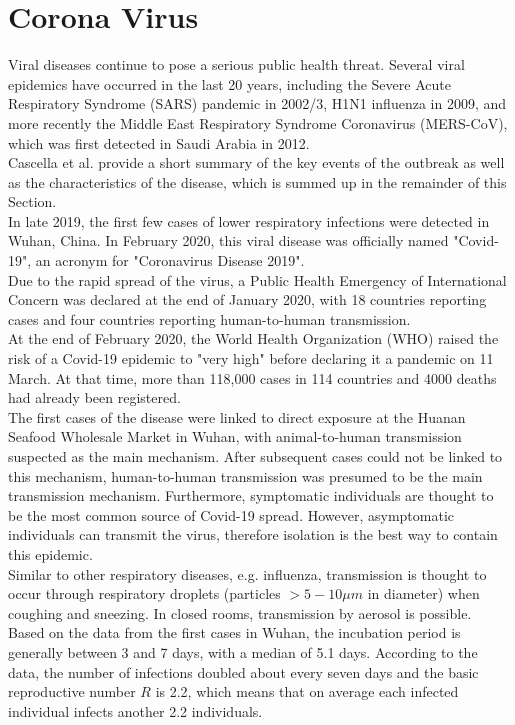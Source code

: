 \section{Corona Virus}
\label{sec:corona}
Viral diseases continue to pose a serious public health threat. Several viral epidemics have occurred in the last 20 years, including the Severe Acute Respiratory Syndrome (SARS) pandemic in 2002/3, H1N1 influenza in 2009, and more recently the Middle East Respiratory Syndrome Coronavirus (MERS-CoV), which was first detected in Saudi Arabia in 2012. \\
Cascella et al. provide a short summary of the key events of the outbreak as well as the characteristics of the disease, which is summed up in the remainder of this Section. \\
In late 2019, the first few cases of lower respiratory infections were detected in Wuhan, China. In February 2020, this viral disease was officially named "Covid-19", an acronym for "Coronavirus Disease 2019". \\
Due to the rapid spread of the virus, a Public Health Emergency of International Concern was declared at the end of January 2020, with 18 countries reporting cases and four countries reporting human-to-human transmission. \\
At the end of February 2020, the World Health Organization (WHO) raised the risk of a Covid-19 epidemic to "very high" before declaring it a pandemic on 11 March. At that time, more than 118,000 cases in 114 countries and 4000 deaths had already been registered. \\
The first cases of the disease were linked to direct exposure at the Huanan Seafood Wholesale Market in Wuhan, with animal-to-human transmission suspected as the main mechanism. After subsequent cases could not be linked to this mechanism, human-to-human transmission was presumed to be the main transmission mechanism. Furthermore, symptomatic individuals are thought to be the most common source of Covid-19 spread. However, asymptomatic individuals can transmit the virus, therefore isolation is the best way to contain this epidemic. \\
Similar to other respiratory diseases, e.g. influenza, transmission is thought to occur through respiratory droplets (particles $>5-10\mu m$ in diameter) when coughing and sneezing. In closed rooms, transmission by aerosol is possible. \\
Based on the data from the first cases in Wuhan, the incubation period is generally between 3 and 7 days, with a median of 5.1 days. According to the data, the number of infections doubled about every seven days and the basic reproductive number $R$ is 2.2, which means that on average each infected individual infects another 2.2 individuals. \\

